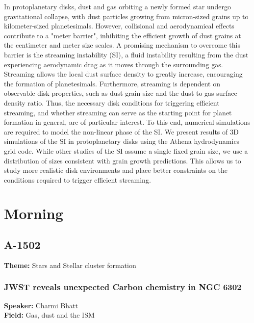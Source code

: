 In protoplanetary disks, dust and gas orbiting a newly formed star undergo gravitational collapse, with dust particles growing from micron-sized grains up to kilometer-sized planetesimals. However, collisional and aerodynamical effects contribute to a "meter barrier", inhibiting the efficient growth of dust grains at the centimeter and meter size scales. A promising mechanism to overcome this barrier is the streaming instability (SI), a fluid instability resulting from the dust experiencing aerodynamic drag as it moves through the surrounding gas. Streaming allows the local dust surface density to greatly increase, encouraging the formation of planetesimals. Furthermore, streaming is dependent on observable disk properties, such as dust grain size and the dust-to-gas surface density ratio. Thus, the necessary disk conditions for triggering efficient streaming, and whether streaming can serve as the starting point for planet formation in general, are of particular interest. To this end, numerical simulations are required to model the non-linear phase of the SI. We present results of 3D simulations of the SI in protoplanetary disks using the Athena hydrodynamics grid code. While other studies of the SI assume a single fixed grain size, we use a distribution of sizes consistent with grain growth predictions. This allows us to study more realistic disk environments and place better constraints on the conditions required to trigger efficient streaming.


\section*{Morning}

\subsection*{A-1502}
\textbf{Theme:} Stars and Stellar cluster formation

\hypertarget{abstract-talk-326}{}\label{abstract-page-talk-326}
\subsubsection*{JWST reveals unexpected Carbon chemistry in NGC 6302}
\textbf{Speaker:} Charmi Bhatt\\
\textbf{Field:} Gas, dust and the ISM

